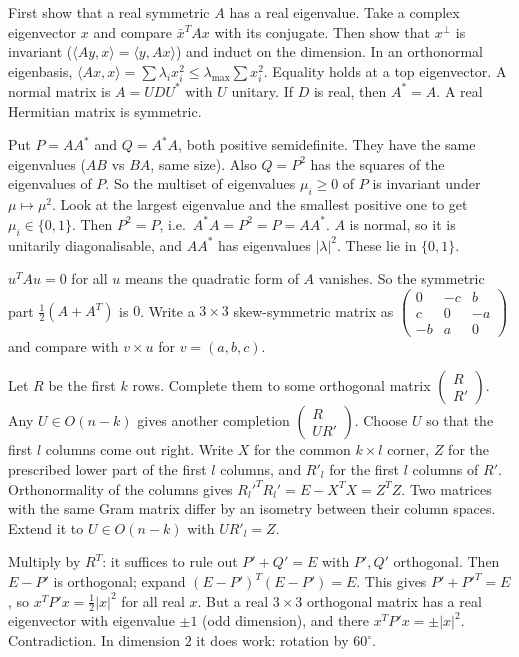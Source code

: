 \documentclass[11pt,a4paper]{article}
\begin{document}

First show that a real symmetric \(A\) has a real eigenvalue. Take a complex eigenvector \(x\) and compare \(\bar x^TAx\) with its conjugate. Then show that \(x^\perp\) is invariant (\(\langle Ay,x\rangle=\langle y,Ax\rangle\)) and induct on the dimension.
In an orthonormal eigenbasis, \(\langle Ax,x\rangle=\sum\lambda_ix_i^2\le\lambda_{\max}\sum x_i^2\). Equality holds at a top eigenvector.
A normal matrix is \(A=UDU^*\) with \(U\) unitary. If \(D\) is real, then \(A^*=A\). A real Hermitian matrix is symmetric.

Put \(P=AA^*\) and \(Q=A^*A\), both positive semidefinite. They have the same eigenvalues (\(AB\) vs \(BA\), same size). Also \(Q=P^2\) has the squares of the eigenvalues of \(P\).
So the multiset of eigenvalues \(\mu_i\ge0\) of \(P\) is invariant under \(\mu\mapsto\mu^2\). Look at the largest eigenvalue and the smallest positive one to get \(\mu_i\in\{0,1\}\). Then \(P^2=P\), i.e.\ \(A^*A=P^2=P=AA^*\).
\(A\) is normal, so it is unitarily diagonalisable, and \(AA^*\) has eigenvalues \(|\lambda|^2\). These lie in \(\{0,1\}\).

\(u^TAu=0\) for all \(u\) means the quadratic form of \(A\) vanishes. So the symmetric part \(\frac12(A+A^T)\) is \(0\).
Write a \(3\times3\) skew-symmetric matrix as \(\begin{pmatrix}0&-c&b\\c&0&-a\\-b&a&0\end{pmatrix}\) and compare with \(v\times u\) for \(v=(a,b,c)\).

Let \(R\) be the first \(k\) rows. Complete them to some orthogonal matrix \(\begin{pmatrix}R\\R'\end{pmatrix}\). Any \(U\in O(n-k)\) gives another completion \(\begin{pmatrix}R\\UR'\end{pmatrix}\). Choose \(U\) so that the first \(l\) columns come out right.
Write \(X\) for the common \(k\times l\) corner, \(Z\) for the prescribed lower part of the first \(l\) columns, and \(R'_l\) for the first \(l\) columns of \(R'\). Orthonormality of the columns gives \(R_l'^TR_l'=E-X^TX=Z^TZ\).
Two matrices with the same Gram matrix differ by an isometry between their column spaces. Extend it to \(U\in O(n-k)\) with \(UR'_l=Z\).

Multiply by \(R^T\): it suffices to rule out \(P'+Q'=E\) with \(P',Q'\) orthogonal. Then \(E-P'\) is orthogonal; expand \((E-P')^T(E-P')=E\).
This gives \(P'+P'^T=E\), so \(x^TP'x=\frac12|x|^2\) for all real \(x\). But a real \(3\times3\) orthogonal matrix has a real eigenvector with eigenvalue \(\pm1\) (odd dimension), and there \(x^TP'x=\pm|x|^2\). Contradiction. In dimension \(2\) it does work: rotation by \(60^\circ\).
\end{document}
